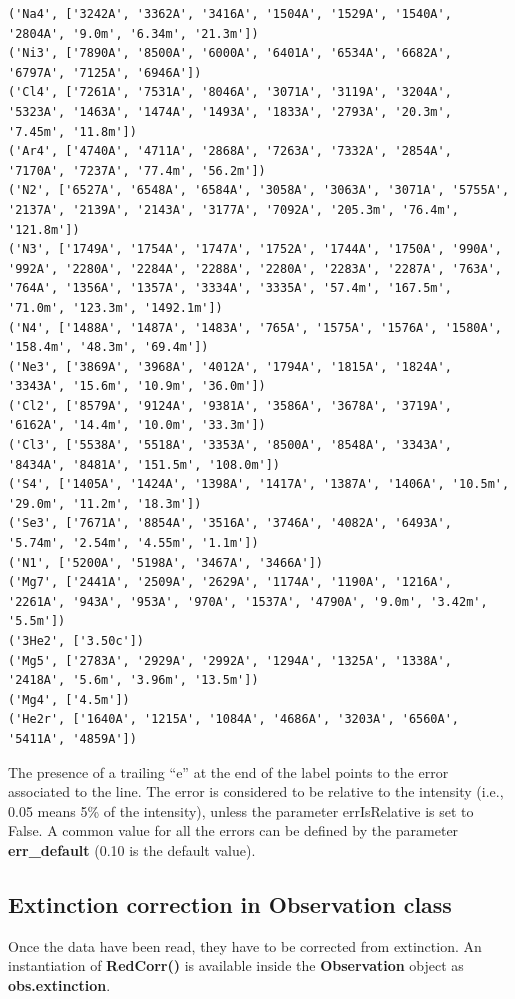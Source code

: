 \documentclass{report}
\begin{document}
\begin{Verbatim}[commandchars=\\\{\}]
('Na4', ['3242A', '3362A', '3416A', '1504A', '1529A', '1540A', '2804A', '9.0m', '6.34m', '21.3m'])
('Ni3', ['7890A', '8500A', '6000A', '6401A', '6534A', '6682A', '6797A', '7125A', '6946A'])
('Cl4', ['7261A', '7531A', '8046A', '3071A', '3119A', '3204A', '5323A', '1463A', '1474A', '1493A', '1833A', '2793A', '20.3m', '7.45m', '11.8m'])
('Ar4', ['4740A', '4711A', '2868A', '7263A', '7332A', '2854A', '7170A', '7237A', '77.4m', '56.2m'])
('N2', ['6527A', '6548A', '6584A', '3058A', '3063A', '3071A', '5755A', '2137A', '2139A', '2143A', '3177A', '7092A', '205.3m', '76.4m', '121.8m'])
('N3', ['1749A', '1754A', '1747A', '1752A', '1744A', '1750A', '990A', '992A', '2280A', '2284A', '2288A', '2280A', '2283A', '2287A', '763A', '764A', '1356A', '1357A', '3334A', '3335A', '57.4m', '167.5m', '71.0m', '123.3m', '1492.1m'])
('N4', ['1488A', '1487A', '1483A', '765A', '1575A', '1576A', '1580A', '158.4m', '48.3m', '69.4m'])
('Ne3', ['3869A', '3968A', '4012A', '1794A', '1815A', '1824A', '3343A', '15.6m', '10.9m', '36.0m'])
('Cl2', ['8579A', '9124A', '9381A', '3586A', '3678A', '3719A', '6162A', '14.4m', '10.0m', '33.3m'])
('Cl3', ['5538A', '5518A', '3353A', '8500A', '8548A', '3343A', '8434A', '8481A', '151.5m', '108.0m'])
('S4', ['1405A', '1424A', '1398A', '1417A', '1387A', '1406A', '10.5m', '29.0m', '11.2m', '18.3m'])
('Se3', ['7671A', '8854A', '3516A', '3746A', '4082A', '6493A', '5.74m', '2.54m', '4.55m', '1.1m'])
('N1', ['5200A', '5198A', '3467A', '3466A'])
('Mg7', ['2441A', '2509A', '2629A', '1174A', '1190A', '1216A', '2261A', '943A', '953A', '970A', '1537A', '4790A', '9.0m', '3.42m', '5.5m'])
('3He2', ['3.50c'])
('Mg5', ['2783A', '2929A', '2992A', '1294A', '1325A', '1338A', '2418A', '5.6m', '3.96m', '13.5m'])
('Mg4', ['4.5m'])
('He2r', ['1640A', '1215A', '1084A', '4686A', '3203A', '6560A', '5411A', '4859A'])
    \end{Verbatim}

    The presence of a trailing ``e'' at the end of the label points to the
error associated to the line. The error is considered to be relative to
the intensity (i.e., 0.05 means 5\% of the intensity), unless the
parameter errIsRelative is set to False. A common value for all the
errors can be defined by the parameter \textbf{err\_default} (0.10 is
the default value).


    \subsection{Extinction correction in Observation class}


    Once the data have been read, they have to be corrected from extinction.
An instantiation of \textbf{RedCorr()} is available inside the
\textbf{Observation} object as \textbf{obs.extinction}.
\end{document}
